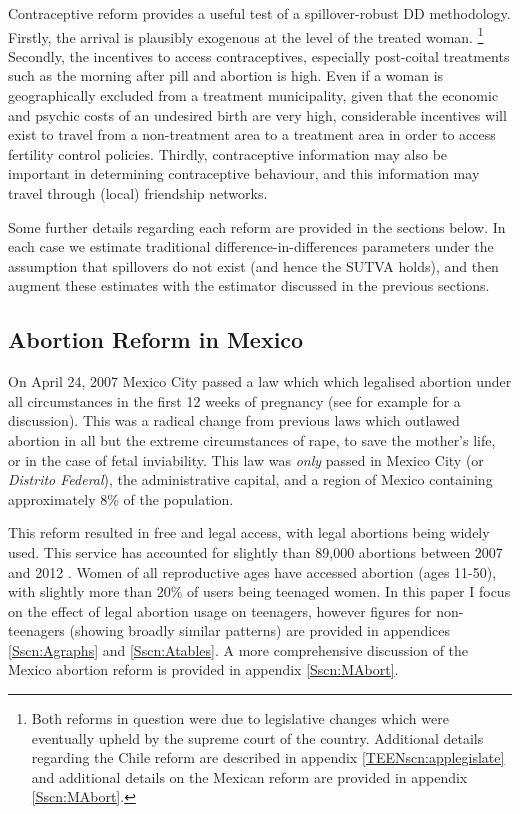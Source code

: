 Contraceptive reform provides a useful test of a spillover-robust DD methodology.
Firstly, the arrival is plausibly exogenous at the level of the treated woman.%
\footnote{Both reforms in question were due to legislative changes which were
eventually upheld by the supreme court of the country.  Additional details 
regarding the Chile reform are described in appendix \ref{TEENscn:applegislate}
and additional details on the Mexican reform are provided in appendix 
\ref{Sscn:MAbort}.}
Secondly, the incentives to access contraceptives, especially post-coital 
treatments such as the morning after pill and abortion is high.  Even if a woman
is geographically excluded from a treatment municipality, given that the economic
and psychic costs of an undesired birth are very high, considerable incentives
will exist to travel from a non-treatment area to a treatment area in order to 
access fertility control policies.  Thirdly, contraceptive information may also 
be important in determining contraceptive behaviour, and this information may 
travel through (local) friendship networks.

Some further details regarding each reform are provided in the sections below.
In each case we estimate traditional difference-in-differences parameters under
the assumption that spillovers do not exist (and hence the SUTVA holds), and
then augment these estimates with the estimator discussed in the previous
sections.

\subsection{Abortion Reform in Mexico}
\label{Ssscn:MexAbort}
On April 24, 2007 Mexico City passed a law which which legalised abortion 
under all circumstances in the first 12 weeks of pregnancy (see for example
\citet{Fraser2014} for a discussion).  This was a radical change from previous 
laws which outlawed abortion in all but the extreme circumstances of rape, 
to save the mother's life, or in the case of fetal inviability.  This law was 
\emph{only} passed in Mexico City (or \emph{Distrito Federal}), the 
administrative capital, and a region of Mexico containing approximately 8\% 
of the population.

This reform resulted in free and legal access, with legal abortions being
widely used.  This service has accounted for slightly than 89,000 abortions
between 2007 and 2012 \citet{Beckeretal2013}.  Women of all reproductive ages
have accessed abortion (ages 11-50), with slightly more than 20\% of users 
being teenaged women.  In this paper I focus on the effect of legal abortion 
usage on teenagers, however figures for non-teenagers (showing broadly similar 
patterns) are provided in appendices \ref{Sscn:Agraphs} and \ref{Sscn:Atables}.  
A more comprehensive discussion of the Mexico abortion reform is provided in 
appendix \ref{Sscn:MAbort}.

